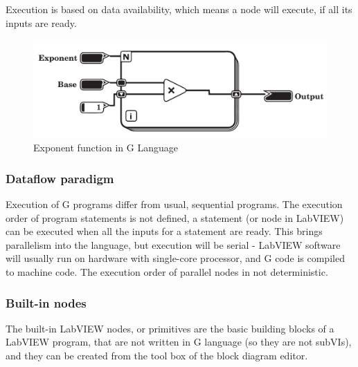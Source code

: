 Execution is based on data availability, which means a node will execute, if all its inputs are ready. 
\begin{figure}

\includegraphics[width=150mm,keepaspectratio]{figures/vi2.pdf}
\caption{Exponent function in G Language} 
\label{fig:gexponent}
\end{figure}

\subsubsection{Dataflow paradigm}
Execution of G programs differ from usual, sequential programs. The execution order of program statements is not defined, a statement (or node in LabVIEW) can be executed when all the inputs for a statement are ready. This brings parallelism into the language, but execution will be serial - LabVIEW software will usually run on hardware with single-core processor, and G code is compiled to machine code. \cite{labview_under_the_hood} The execution order of parallel nodes in not deterministic. 
\subsubsection{Built-in nodes}
The built-in LabVIEW nodes, or primitives are the basic building blocks of a LabVIEW program, that are not written in G language (so they are not subVIs), and they can be created from the tool box of the block diagram editor.

